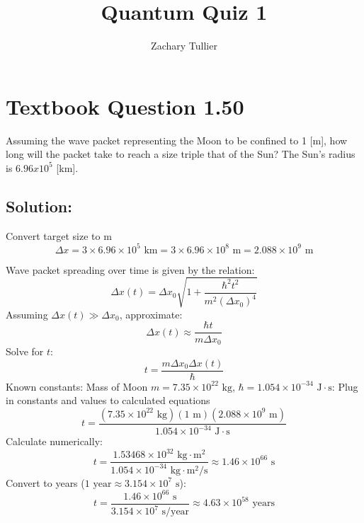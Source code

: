 \documentclass[12pt]{article}
\begin{document}
\singlespacing  %
\title{Quantum Quiz 1}

\author[1]{Zachary Tullier}
\date{}
\maketitle

\section{Textbook Question 1.50}
    Assuming the wave packet representing the Moon to be confined to 1 [m], how long will the packet take to reach a size triple that of the Sun? The Sun's radius is $6.96 x 10^5$ [km].


    \subsection{Solution:}
        Convert target size to m
        \[
        \Delta x = 3 \times 6.96 \times 10^5 \text{ km} = 3 \times 6.96 \times 10^8 \text{ m} = 2.088 \times 10^9 \text{ m}
        \]

        Wave packet spreading over time is given by the relation:
        \[
        \Delta x(t) = \Delta x_0 \sqrt{1+\frac{\hbar^2 t^2}{m^2 (\Delta x_0)^4}}
        \]
        Assuming \(\Delta x(t)\gg \Delta x_0\), approximate:
        \[
        \Delta x(t) \approx \frac{\hbar t}{m \Delta x_0}
        \]
        Solve for \(t\):
        \[
        t = \frac{m \Delta x_0 \Delta x(t)}{\hbar}
        \]
        Known constants:
        Mass of Moon \(m = 7.35 \times 10^{22}\text{ kg}\),
        \(\hbar = 1.054 \times 10^{-34}\text{ J}\cdot\text{s}\):
        Plug in constants and values to calculated equations
        \[
        t = \frac{(7.35 \times 10^{22}\text{ kg})(1\text{ m})(2.088 \times 10^9\text{ m})}{1.054 \times 10^{-34}\text{ J}\cdot\text{s}}
        \]
        Calculate numerically:
        \[
        t = \frac{1.53468 \times 10^{32}\text{ kg}\cdot\text{m}^2}{1.054 \times 10^{-34}\text{ kg}\cdot\text{m}^2/\text{s}} \approx 1.46 \times 10^{66}\text{ s}
        \]
        Convert to years (\(1\text{ year}\approx 3.154\times 10^7\text{ s}\)):
        \[
        t = \frac{1.46 \times 10^{66}\text{ s}}{3.154\times 10^7\text{ s/year}}\approx 4.63 \times 10^{58}\text{ years}
        \]
\end{document}
